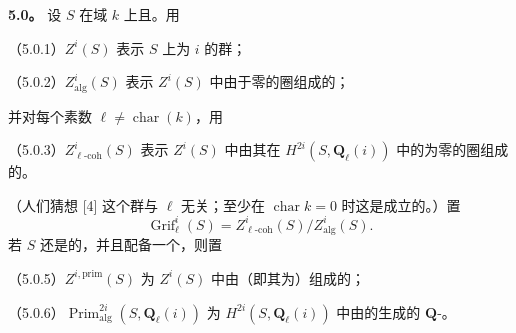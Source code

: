 \textbf{5.0。} 设 $S$ 在域 $k$ 上且。用

\noindent（5.0.1）$Z^i(S)$ 表示 $S$ 上为 $i$ 的群；

\noindent（5.0.2）$Z^i_{\mathrm{alg}}(S)$ 表示 $Z^i(S)$ 中由于零的圈组成的；

并对每个素数 $\ell\ne\operatorname{char}(k)$，用

\noindent（5.0.3）$Z^i_{\ell\text{-}\mathrm{coh}}(S)$ 表示 $Z^i(S)$ 中由其在 $H^{2i}(S,\mathbf Q_\ell(i))$ 中的为零的圈组成的。

（人们猜想 [4] 这个群与 $\ell$ 无关；至少在 $\operatorname{char}k=0$ 时这是成立的。）置
\begin{equation}\tag{5.0.4}
\operatorname{Grif}^i_\ell(S)=Z^i_{\ell\text{-}\mathrm{coh}}(S)/Z^i_{\mathrm{alg}}(S).
\end{equation}
若 $S$ 还是的，并且配备一个，则置

\noindent（5.0.5）$Z^{i,\mathrm{prim}}(S)$ 为 $Z^i(S)$ 中由（即其为）组成的；

\noindent（5.0.6）$\operatorname{Prim}^{2i}_{\mathrm{alg}}(S,\mathbf Q_\ell(i))$ 为 $H^{2i}(S,\mathbf Q_\ell(i))$ 中由的生成的 $\mathbf Q$-。

